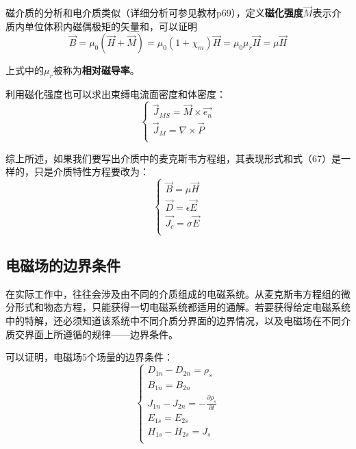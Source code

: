 \documentclass[UTF8,a4paper,11pt]{article}
\begin{document}
磁介质的分析和电介质类似（详细分析可参见教材p69），定义\textbf{磁化强度}$\overrightarrow{M}$表示介质内单位体积内磁偶极矩的矢量和，可以证明
\begin{equation}
\overrightarrow{B}=\mu_0(\overrightarrow{H}+\overrightarrow{M})=\mu_0(1+\chi_m)\overrightarrow{H}=\mu_0\mu_r\overrightarrow{H}=\mu\overrightarrow{H}
\end{equation}

上式中的$\mu_r$被称为\textbf{相对磁导率}。

利用磁化强度也可以求出束缚电流面密度和体密度：
\begin{equation}
\begin{cases}
\overrightarrow{J}_{MS}=\overrightarrow{M}\times\overrightarrow{e_n}\\
\overrightarrow{J}_M=\nabla\times\overrightarrow{P}\\
\end{cases}
\end{equation}

综上所述，如果我们要写出介质中的麦克斯韦方程组，其表现形式和式（67）是一样的，只是介质特性方程要改为：
\begin{equation}
\begin{cases}
\overrightarrow{B}=\mu\overrightarrow{H}\\
\overrightarrow{D}=\epsilon\overrightarrow{E}\\
\overrightarrow{J_c}=\sigma\overrightarrow{E}\\
\end{cases}
\end{equation}

\subsection{电磁场的边界条件}
在实际工作中，往往会涉及由不同的介质组成的电磁系统。从麦克斯韦方程组的微分形式和物态方程，只能获得一切电磁系统都适用的通解。若要获得给定电磁系统中的特解，还必须知道该系统中不同介质分界面的边界情况，以及电磁场在不同介质交界面上所遵循的规律——边界条件。

可以证明，电磁场5个场量的边界条件：
\begin{equation}
\begin{cases}
D_{1n}-D_{2n}=\rho_s\\
B_{1n}=B_{2n}\\
J_{1n}-J_{2n}=-\frac{\partial\rho_s}{\partial t}\\
E_{1s}=E_{2s}\\
H_{1s}-H_{2s}=J_s\\
\end{cases}
\end{equation}
\end{document}
